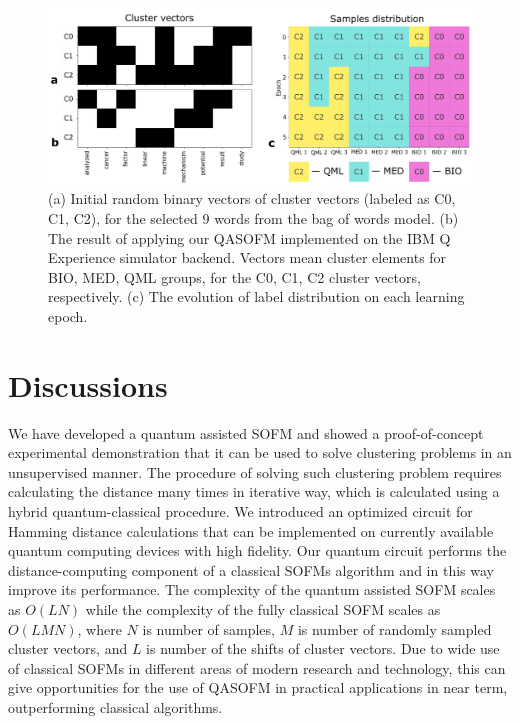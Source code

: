 \documentclass[pra,showkeys,twocolumn,showpacs]{revtex4-1}
\begin{document}
\begin{figure}[t]
	\includegraphics[width=0.95\columnwidth]{convergence.png}
	\caption{
		(a) Initial random binary vectors of cluster vectors (labeled as C0, C1, C2), 
		for the selected 9 words from the bag of words model. 
		(b) The result of applying our QASOFM implemented on the IBM Q Experience simulator backend. 
		Vectors mean cluster elements for BIO, MED, QML groups, 
		for the C0, C1, C2 cluster vectors, respectively. 
		(c) The evolution of label distribution on each learning epoch.
	} 
	\label{convergence}
\end{figure}



\section{Discussions}
We have developed a quantum assisted SOFM and showed a proof-of-concept experimental demonstration 
that it can be used to solve clustering problems in an unsupervised manner.  
The procedure of solving such clustering problem requires calculating the distance many times in iterative way, 
which is calculated using a hybrid quantum-classical procedure.  
We introduced an optimized circuit for Hamming distance calculations that can be implemented on currently available quantum computing devices with high fidelity. 
Our quantum circuit performs the distance-computing component of a classical SOFMs algorithm 
and in this way improve its performance. 
The complexity of the quantum assisted SOFM scales as $O(LN)$ 
while the complexity of the fully classical SOFM scales as $O(LMN)$, 
where $N$ is number of samples, $M$ is number of randomly sampled cluster vectors, 
and $L$ is number of the shifts of cluster vectors.
Due to wide use of classical SOFMs in different areas of modern research and technology, 
this can give opportunities for the use of QASOFM in practical applications in near term, outperforming classical algorithms.  
\end{document}
